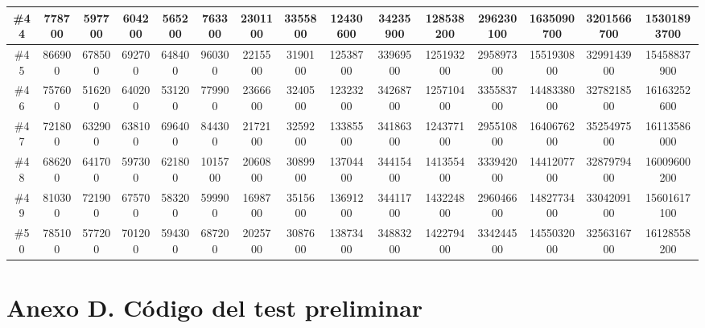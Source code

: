 \documentclass[titlepage]{article}
\begin{document}
\begin{landscape}
\begin{table}[h]
\begin{tabular}{|c|c|c|c|c|c|c|c|c|c|c|c|c|c|c|}
			\hline
			\#44     & 778700  & 597700  & 604200 & 565200  & 763300  & 2301100 & 3355800 & 12430600 & 34235900 & 128538200 & 296230100 & 1635090700 & 3201566700 & 15301893700  \\ 
			\hline
			\#45     & 866900  & 678500  & 692700 & 648400  & 960300  & 2215500 & 3190100 & 12538700 & 33969500 & 125193200 & 295897300 & 1551930800 & 3299143900 & 15458837900  \\ 
			\hline
			\#46     & 757600  & 516200  & 640200 & 531200  & 779900  & 2366600 & 3240500 & 12323200 & 34268700 & 125710400 & 335583700 & 1448338000 & 3278218500 & 16163252600  \\ 
			\hline
			\#47     & 721800  & 632900  & 638100 & 696400  & 844300  & 2172100 & 3259200 & 13385500 & 34186300 & 124377100 & 295510800 & 1640676200 & 3525497500 & 16113586000  \\ 
			\hline
			\#48     & 686200  & 641700  & 597300 & 621800  & 1015700 & 2060800 & 3089900 & 13704400 & 34415400 & 141355400 & 333942000 & 1441207700 & 3287979400 & 16009600200  \\ 
			\hline
			\#49     & 810300  & 721900  & 675700 & 583200  & 599900  & 1698700 & 3515600 & 13691200 & 34411700 & 143224800 & 296046600 & 1482773400 & 3304209100 & 15601617100  \\ 
			\hline
			\#50     & 785100  & 577200  & 701200 & 594300  & 687200  & 2025700 & 3087600 & 13873400 & 34883200 & 142279400 & 334244500 & 1455032000 & 3256316700 & 16128558200  \\
			\hline
		\end{tabular}
	\end{table}
\end{landscape}

\section*{Anexo D. Código del test preliminar}
\end{document}
